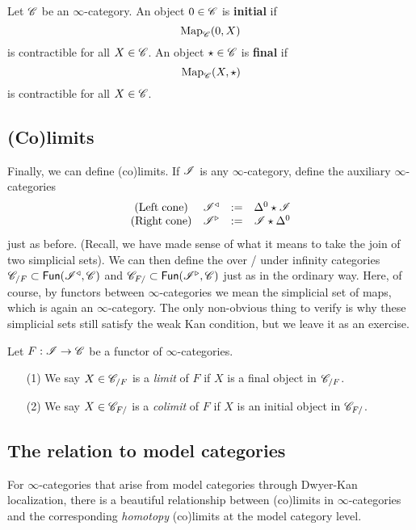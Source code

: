 \documentclass[11pt]{amsart}
\def\Fun{{\sf Fun}}
\def\lcone{\triangleleft}
\def\rcone{\triangleright}
\begin{document}
\begin{dfn}
Let $\mathscr C$ be an $\infty$-category.
An object $0 \in \mathscr C$ is {\bf initial} if 
\[
{\rm Map}_{\mathscr C}(0, X)
\]
is contractible for all $X \in \mathscr C$.
An object $\star \in \mathscr C$ is {\bf final} if 
\[
{\rm Map}_{\mathscr C}(X, \star)
\]
is contractible for all $X \in \mathscr C$. 
\end{dfn}

\subsection{(Co)limits}

Finally, we can define (co)limits. 
If $\mathscr I$ is any $\infty$-category, define the auxiliary $\infty$-categories
\[
\begin{array}{ccccc}
({\rm Left \; cone}) & \sI^{\lcone} & := & \Delta^0 \star \sI \\
({\rm Right \; cone}) & \sI^{\rcone} & := & \sI \star \Delta^0
\end{array}
\]
just as before. 
(Recall, we have made sense of what it means to take the join of two simplicial sets). 
We can then define the over / under infinity categories $\sC_{/F} \subset \Fun(\sI^{\lcone}, \sC)$ and $\sC_{F/} \subset \Fun(\sI^{\rcone}, \sC)$ just as in the ordinary way. 
Here, of course, by functors between $\infty$-categories we mean the simplicial set of maps, which is again an $\infty$-category. 
The only non-obvious thing to verify is why these simplicial sets still satisfy the weak Kan condition, but we leave it as an exercise. 

\begin{dfn}
Let $F : \mathscr I \to \mathscr C$ be a functor of $\infty$-categories.
\begin{itemize}
\item[(1)] We say $X \in \mathscr C_{/F}$ is a {\em limit} of $F$ if $X$ is a final object in $\mathscr C_{/F}$. 
\item[(2)] We say $X \in \mathscr C_{F/}$ is a {\em colimit} of $F$ if $X$ is an initial object in $\mathscr C_{F/}$. 
\end{itemize}
\end{dfn}

\subsection{The relation to model categories}

For $\infty$-categories that arise from model categories through Dwyer-Kan localization, there is a beautiful relationship between (co)limits in $\infty$-categories and the corresponding {\em homotopy} (co)limits at the model category level.
\end{document}
